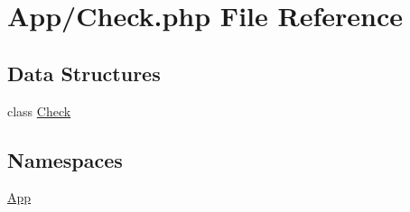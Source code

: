 \hypertarget{_check_8php}{}\section{App/\+Check.php File Reference}
\label{_check_8php}
\subsection*{Data Structures}
\begin{DoxyCompactItemize}
\item 
class \hyperlink{class_app_1_1_check}{Check}
\end{DoxyCompactItemize}
\subsection*{Namespaces}
\begin{DoxyCompactItemize}
\item 
 \hyperlink{namespace_app}{App}
\end{DoxyCompactItemize}
